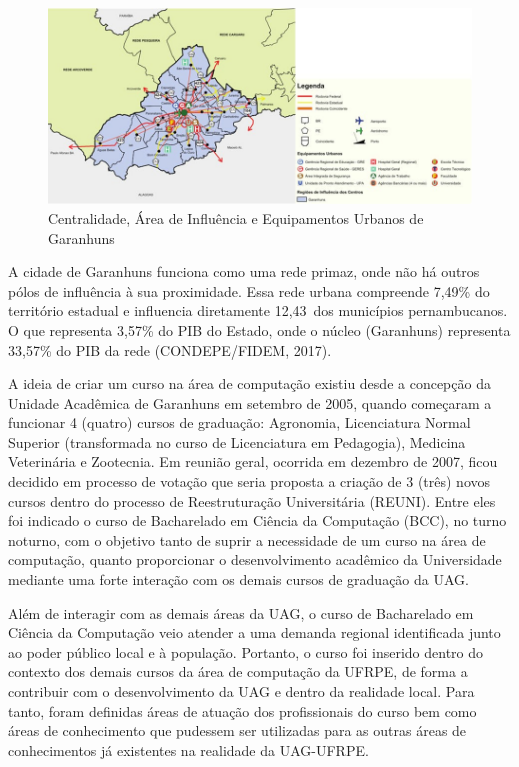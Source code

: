 \documentclass[
	12pt,				%
	openright,			%
  oneside,     %
	a4paper,			%
	chapter=TITLE,		%
	english,			%
	french,				%
	spanish,			%
	brazil				%
	]{abntex2}
\begin{document}
\begin{figure}[!htb]
    \centering
    \caption{\label{fig:centralidade}Centralidade, Área de Influência e Equipamentos Urbanos de Garanhuns}
    
    \includegraphics[width=\textwidth]{images/centralidade.png}
\end{figure}


A cidade de Garanhuns funciona como uma rede primaz, onde não há outros pólos de influência à sua proximidade. Essa rede urbana compreende 7,49\% do território estadual e influencia diretamente 12,43\ dos municípios pernambucanos. O que representa 3,57\% do PIB do Estado, onde o núcleo (Garanhuns) representa 33,57\% do PIB da rede (CONDEPE/FIDEM, 2017).

A ideia de criar um curso na área de computação existiu desde a concepção da Unidade Acadêmica de Garanhuns em setembro de 2005, quando começaram a funcionar 4 (quatro) cursos de graduação: Agronomia, Licenciatura Normal Superior (transformada no curso de Licenciatura em Pedagogia), Medicina Veterinária e Zootecnia. Em reunião geral, ocorrida em dezembro de 2007, ficou decidido em processo de votação que seria proposta a criação de 3 (três) novos cursos dentro do processo de Reestruturação Universitária (REUNI). Entre eles foi indicado o curso de Bacharelado em Ciência da Computação (BCC), no turno noturno, com o objetivo tanto de suprir a necessidade de um curso na área de computação, quanto proporcionar o desenvolvimento acadêmico da Universidade mediante uma forte interação com os demais cursos de graduação da UAG.

Além de interagir com as demais áreas da UAG, o curso de Bacharelado em Ciência da Computação veio atender a uma demanda regional identificada junto ao poder público local e à população. Portanto, o curso foi inserido dentro do contexto dos demais cursos da área de computação da UFRPE, de forma a contribuir com o desenvolvimento da UAG e dentro da realidade local. Para tanto, foram definidas áreas de atuação dos profissionais do curso bem como áreas de conhecimento que pudessem ser utilizadas para as outras áreas de conhecimentos já existentes na realidade da UAG-UFRPE.
\end{document}
